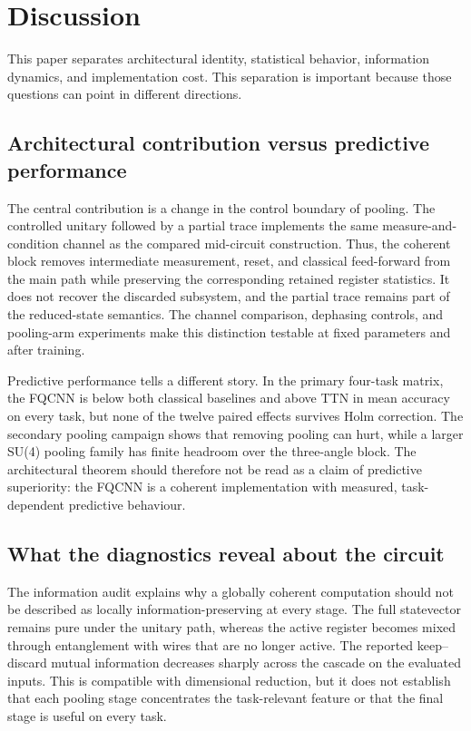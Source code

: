 \documentclass[conference]{IEEEtran}
\begin{document}
\section{Discussion}
This paper separates architectural identity, statistical behavior,
information dynamics, and implementation cost. This separation is important
because those questions can point in different directions. 

\subsection{Architectural contribution versus predictive performance}
The central contribution is a change in the control boundary of pooling. The
controlled unitary followed by a partial trace implements the same
measure-and-condition channel as the compared mid-circuit construction. Thus,
the coherent block removes intermediate measurement, reset, and classical
feed-forward from the main path while preserving the corresponding retained
register statistics. It does not recover the discarded subsystem, and the
partial trace remains part of the reduced-state semantics. The channel
comparison, dephasing controls, and pooling-arm experiments make this
distinction testable at fixed parameters and after training.

Predictive performance tells a different story. In the primary four-task
matrix, the FQCNN is below both classical baselines and above TTN in mean
accuracy on every task, but none of the twelve paired effects survives Holm
correction. The secondary pooling campaign shows that removing pooling can
hurt, while a larger SU(4) pooling family has finite headroom over the
three-angle block. The architectural theorem should therefore not be read as a claim of predictive superiority: the FQCNN is a coherent implementation with measured, task-dependent predictive behaviour.

\subsection{What the diagnostics reveal about the circuit}
The information audit explains why a globally coherent computation should not
be described as locally information-preserving at every stage. The full
statevector remains pure under the unitary path, whereas the active register
becomes mixed through entanglement with wires that are no longer active. The
reported keep--discard mutual information decreases sharply across the
cascade on the evaluated inputs. This is compatible with dimensional reduction,
but it does not establish that each pooling stage concentrates the task-relevant
feature or that the final stage is useful on every task.
\end{document}
